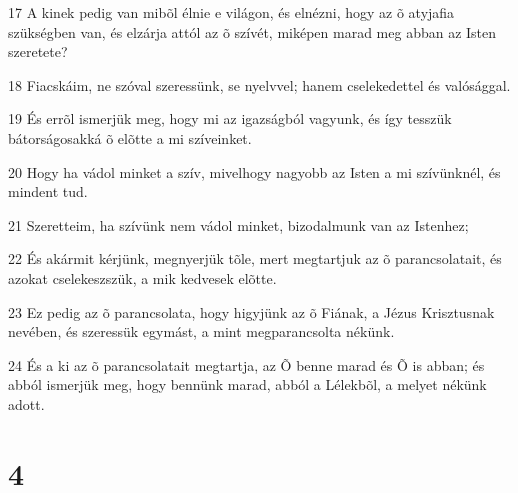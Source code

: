 \par 17 A kinek pedig van mibõl élnie e világon, és elnézni, hogy az õ atyjafia szükségben van, és elzárja attól az õ szívét, miképen marad meg abban az Isten szeretete?
\par 18 Fiacskáim, ne szóval szeressünk, se nyelvvel; hanem cselekedettel és valósággal.
\par 19 És errõl ismerjük meg, hogy mi az igazságból vagyunk, és így tesszük bátorságosakká õ elõtte a mi szíveinket.
\par 20 Hogy ha vádol minket a szív, mivelhogy nagyobb az Isten a mi szívünknél, és mindent tud.
\par 21 Szeretteim, ha szívünk nem vádol minket, bizodalmunk van az Istenhez;
\par 22 És akármit kérjünk, megnyerjük tõle, mert megtartjuk az õ parancsolatait, és azokat cselekeszszük, a mik kedvesek elõtte.
\par 23 Ez pedig az õ parancsolata, hogy higyjünk az õ Fiának, a Jézus Krisztusnak nevében, és szeressük egymást,  a mint megparancsolta nékünk.
\par 24 És a ki az õ parancsolatait megtartja, az Õ benne marad és Õ is abban; és abból ismerjük meg, hogy bennünk marad, abból a Lélekbõl, a melyet nékünk adott.

\chapter{4}

